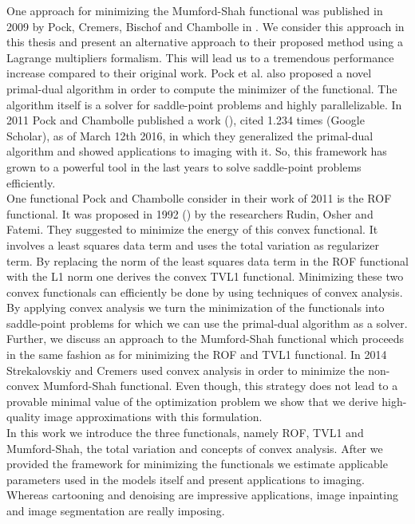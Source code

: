 \documentclass[abstracton]{scrreprt}
\begin{document}
    One approach for minimizing the Mumford-Shah functional was published in 2009 by Pock, Cremers, Bischof and Chambolle in \cite{Pock-et-al-iccv09}. We consider this approach in this thesis and present an alternative approach to their proposed method using a Lagrange multipliers formalism. This will lead us to a tremendous performance increase compared to their original work. Pock et al. also proposed a novel primal-dual algorithm in order to compute the minimizer of the functional. The algorithm itself is a solver for saddle-point problems and highly parallelizable. In 2011 Pock and Chambolle published a work (\cite{Chambolle10afirst-order}), cited 1.234 times (Google Scholar), as of March 12th 2016, in which they generalized the primal-dual algorithm and showed applications to imaging with it. So, this framework has grown to a powerful tool in the last years to solve saddle-point problems efficiently.\\
    One functional Pock and Chambolle consider in their work of 2011 is the ROF functional. It was proposed in 1992 (\cite{ROF}) by the researchers Rudin, Osher and Fatemi. They suggested to minimize the energy of this convex functional. It involves a least squares data term and uses the total variation as regularizer term. By replacing the norm of the least squares data term in the ROF functional with the L1 norm one derives the convex TVL1 functional. Minimizing these two convex functionals can efficiently be done by using techniques of convex analysis. By applying convex analysis we turn the minimization of the functionals into saddle-point problems for which we can use the primal-dual algorithm as a solver. Further, we discuss an approach to the Mumford-Shah functional which proceeds in the same fashion as for minimizing the ROF and TVL1 functional. In 2014 Strekalovskiy and Cremers used convex analysis in order to minimize the non-convex Mumford-Shah functional. Even though, this strategy does not lead to a provable minimal value of the optimization problem we show that we derive high-quality image approximations with this formulation.\\
    In this work we introduce the three functionals, namely ROF, TVL1 and Mumford-Shah, the total variation and concepts of convex analysis. After we provided the framework for minimizing the functionals we estimate applicable parameters used in the models itself and present applications to imaging. Whereas cartooning and denoising are impressive applications, image inpainting and image segmentation are really imposing.
\end{document}
